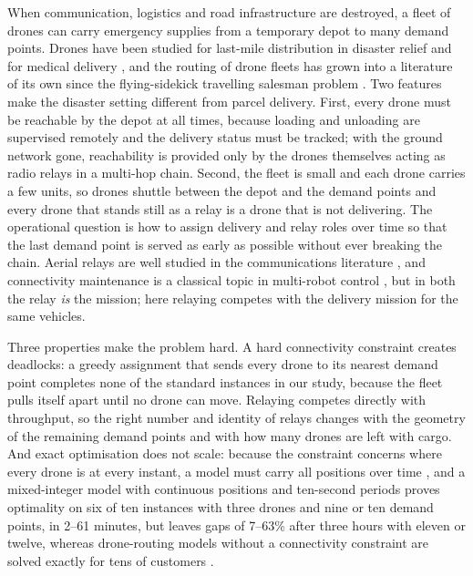 \documentclass[final,5p,times,twocolumn]{elsarticle}
\begin{document}
When communication, logistics and road infrastructure are destroyed, a fleet of drones can carry
emergency supplies from a temporary depot to many demand points. Drones have been studied
for last-mile distribution in disaster relief \cite{chowdhury2017,rabta2018,erdelj2017} and for
medical delivery \cite{kim2017,ghelichi2021}, and the routing of drone fleets has grown into a
literature of its own since the flying-sidekick travelling salesman problem
\cite{murray2015,otto2018,macrina2020,chung2020}. Two features make the disaster setting
different from parcel delivery. First, every drone must be reachable by the depot at all
times, because loading and unloading are supervised remotely and the delivery status must be
tracked; with the ground network gone, reachability is provided only by the drones themselves
acting as radio relays in a multi-hop chain. Second, the fleet is small and each drone carries a
few units, so drones shuttle between the depot and the demand points and every drone that stands
still as a relay is a drone that is not delivering. The operational question is how to assign
delivery and relay roles over time so that the last demand point is served as early as possible
without ever breaking the chain. Aerial relays are well studied in the communications literature
\cite{zeng2016,mozaffari2019,burdakov2010}, and connectivity maintenance is a classical topic in
multi-robot control \cite{zavlanos2011,dixon2009}, but in both the relay \emph{is} the mission;
here relaying competes with the delivery mission for the same vehicles.

Three properties make the problem hard. A hard connectivity constraint creates deadlocks: a greedy
assignment that sends every drone to its nearest demand point completes none of the standard
instances in our study, because the fleet pulls itself apart until no drone can move. Relaying
competes directly with throughput, so the right number and identity of relays changes with the
geometry of the remaining demand points and with how many drones are left with cargo. And exact
optimisation does not scale: because the constraint concerns where every drone is at every
instant, a model must carry all positions over time \cite{ford1962,skutella2009}, and a
mixed-integer model with continuous positions and ten-second periods proves optimality on six of
ten instances with three drones and nine or ten demand points, in 2--61 minutes, but leaves gaps of
7--63\% after three hours with eleven or twelve, whereas drone-routing models without a connectivity constraint are solved
exactly for tens of customers \cite{roberti2021}.
\end{document}
